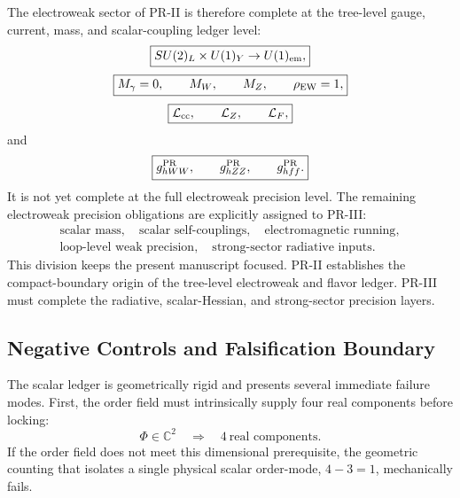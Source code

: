 \documentclass[11pt]{article}
\begin{document}
The electroweak sector of PR-II is therefore complete at the tree-level gauge, current, mass, and scalar-coupling ledger level:
\begin{equation}
\boxed{
SU(2)_L\times U(1)_Y
\rightarrow
U(1)_{\rm em},
}
\end{equation}
\begin{equation}
\boxed{
M_\gamma=0,
\qquad
M_W,
\qquad
M_Z,
\qquad
\rho_{\rm EW}=1,
}
\end{equation}
\begin{equation}
\boxed{
\mathcal L_{\rm cc},
\qquad
\mathcal L_Z,
\qquad
\mathcal L_F,
}
\end{equation}
and
\begin{equation}
\boxed{
g_{hWW}^{\rm PR},
\qquad
g_{hZZ}^{\rm PR},
\qquad
g_{hff}^{\rm PR}.
}
\end{equation}
It is not yet complete at the full electroweak precision level. The remaining electroweak precision obligations are explicitly assigned to PR-III:
\begin{equation}
\boxed{
\begin{gathered}
\text{scalar mass},
\quad
\text{scalar self-couplings},
\quad
\text{electromagnetic running},\\
\text{loop-level weak precision},
\quad
\text{strong-sector radiative inputs}.
\end{gathered}
}
\end{equation}
This division keeps the present manuscript focused. 
PR-II establishes the compact-boundary origin of the tree-level electroweak and flavor ledger. 
PR-III must complete the radiative, scalar-Hessian, and strong-sector precision layers.

\subsection{Negative Controls and Falsification Boundary}
\label{sec:pr2_order_mode_negative_controls}

The scalar ledger is geometrically rigid and presents several immediate failure modes. First, the order field must intrinsically supply four real components before locking:
\begin{equation}
\Phi
\in
\mathbb C^2
\quad
\Longrightarrow
\quad
4\ \text{real components}.
\end{equation}
If the order field does not meet this dimensional prerequisite, the geometric counting that isolates a single physical scalar order-mode, $4-3=1$, mechanically fails.
\end{document}
